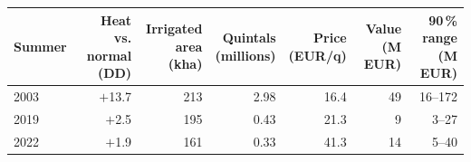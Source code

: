 \begin{tabular}{lrrrrrr}
\toprule
Summer & \shortstack{Heat vs.\\normal (DD)} & \shortstack{Irrigated\\area (kha)} & \shortstack{Quintals\\(millions)} & \shortstack{Price\\(EUR/q)} & \shortstack{Value\\(M EUR)} & \shortstack{90\,\% range\\(M EUR)} \\
\midrule
2003 & $+$13.7 & 213 & 2.98 & 16.4 & 49 & 16--172 \\
2019 & $+$2.5 & 195 & 0.43 & 21.3 & 9 & 3--27 \\
2022 & $+$1.9 & 161 & 0.33 & 41.3 & 14 & 5--40 \\
\bottomrule
\end{tabular}
